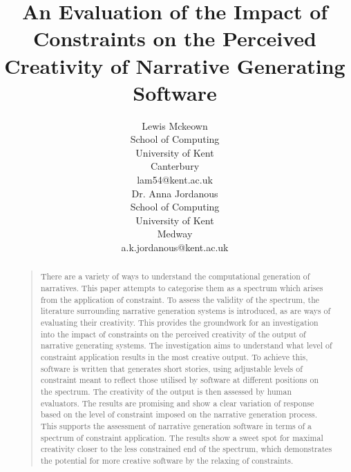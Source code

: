 \documentclass[letterpaper]{article}
\title{An Evaluation of the Impact of Constraints on the Perceived Creativity of Narrative Generating Software}
\author{Lewis Mckeown\\
School of Computing\\
University of Kent\\
Canterbury\\
lam54@kent.ac.uk\\ 
\And Dr. Anna Jordanous\\
School of Computing\\
University of Kent\\
Medway\\
a.k.jordanous@kent.ac.uk\\
}
\begin{document}
 
\maketitle

\begin{abstract}
\begin{quote}
There are a variety of ways to understand the computational generation of narratives. This paper attempts to categorise them as a spectrum which arises from the application of constraint. To assess the validity of the spectrum, the literature surrounding narrative generation systems is introduced, as are ways of evaluating their creativity. This provides the groundwork for an investigation into the impact of constraints on the perceived creativity of the output of narrative generating systems. The investigation aims to understand what level of constraint application results in the most creative output. To achieve this, software is written that generates short stories, using adjustable levels of constraint meant to reflect those utilised by software at different positions on the spectrum. The creativity of the output is then assessed by human evaluators. The results are promising and show a clear variation of response based on the level of constraint imposed on the narrative generation process. This supports the assessment of narrative generation software in terms of a spectrum of constraint application. The results show a sweet spot for maximal creativity closer to the less constrained end of the spectrum, which demonstrates the potential for more creative software by the relaxing of constraints. \end{quote}
\end{abstract}

\end{document}
